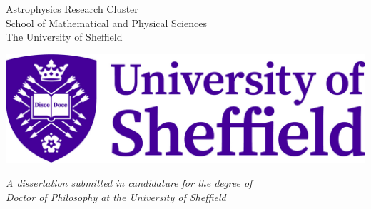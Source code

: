 



\begin{center}
    \vspace*{2cm}

    \begin{Huge}
        \makeatletter
        \textbf{\@title}
        \makeatother
    \end{Huge}

    \vspace*{2.5cm}

    \begin{LARGE}
        \makeatletter
        \textbf{\@author}
        \makeatother
    \end{LARGE}

    \vspace*{1cm}

    \begin{Large}
        Astrophysics Research Cluster \\
        School of Mathematical and Physical Sciences \\
        The University of Sheffield
    \end{Large}

    \vspace*{2cm}

    \includegraphics[width=0.5\linewidth]{images/sheffield_newlogo.jpg}

    \vspace*{2cm}

    \begin{large}
        \textit{A dissertation submitted in candidature for the degree of} \\
        \textit{Doctor of Philosophy at the University of Sheffield}
    \end{large}

    \vspace*{1cm}

    \begin{large}
        \makeatletter
        \text{\@date}
        \makeatother
    \end{large}

    \vfill
\end{center}
